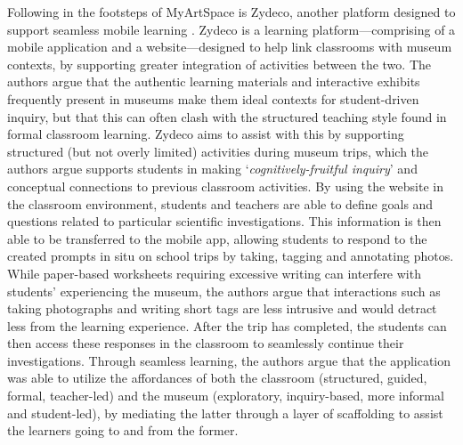 Following in the footsteps of MyArtSpace is Zydeco, another platform designed to support seamless mobile learning \citep{cahill2010, kuhn2011}. Zydeco is a learning platform---comprising of a mobile application and a website---designed to help link classrooms with museum contexts, by supporting greater integration of activities between the two. The authors argue that the authentic learning materials and interactive exhibits frequently present in museums make them ideal contexts for student-driven inquiry, but that this can often clash with the structured teaching style found in formal classroom learning. Zydeco aims to assist with this by supporting structured (but not overly limited) activities during museum trips, which the authors argue supports students in making `\textit{cognitively-fruitful inquiry}' and conceptual connections to previous classroom activities. By using the website in the classroom environment, students and teachers are able to define goals and questions related to particular scientific investigations. This information is then able to be transferred to the mobile app, allowing students to respond to the created prompts in situ on school trips by taking, tagging and annotating photos. While paper-based worksheets requiring excessive writing can interfere with students' experiencing the museum, the authors argue that interactions such as taking photographs and writing short tags are less intrusive and would detract less from the learning experience.  After the trip has completed, the students can then access these responses in the classroom to seamlessly continue their investigations. Through seamless learning, the authors argue that the application was able to utilize the affordances of both the classroom (structured, guided, formal, teacher-led) and the museum (exploratory, inquiry-based, more informal and student-led), by mediating the latter through a layer of scaffolding to assist the learners going to and from the former.

